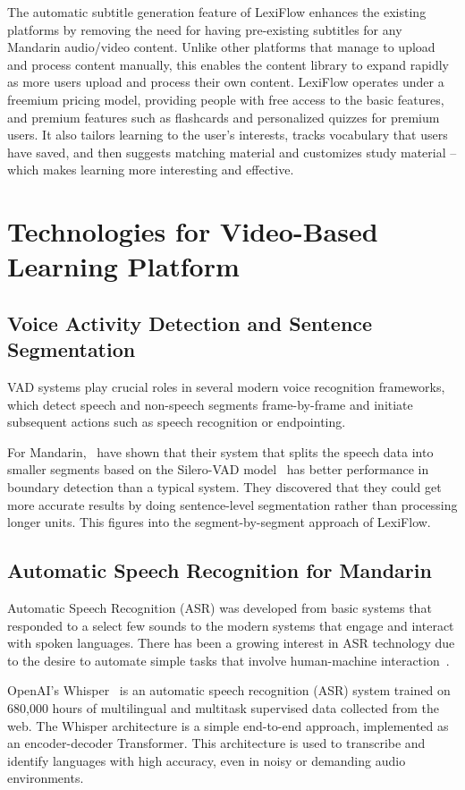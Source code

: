 \documentclass[oneside]{utmthesis}
\begin{document}
The automatic subtitle generation feature of LexiFlow enhances the existing platforms by removing the need for having pre-existing subtitles for any Mandarin audio/video content. Unlike other platforms that manage to upload and process content manually, this enables the content library to expand rapidly as more users upload and process their own content. LexiFlow operates under a freemium pricing model, providing people with free access to the basic features, and premium features such as flashcards and personalized quizzes for premium users. It also tailors learning to the user's interests, tracks vocabulary that users have saved, and then suggests matching material and customizes study material – which makes learning more interesting and effective.


\section{Technologies for Video-Based Learning Platform}
\subsection{Voice Activity Detection and Sentence Segmentation}
VAD systems play crucial roles in several modern voice recognition frameworks, which detect speech and non-speech segments frame-by-frame and initiate subsequent actions such as speech recognition or endpointing.~\citep{buddi2023,icassp-2019,chen2020,kumar2024}

For Mandarin,~\citet{pan2025} have shown that their system that splits the speech data into smaller segments based on the Silero-VAD model~\citep{sileroVAD} has better performance in boundary detection than a typical system. They discovered that they could get more accurate results by doing sentence-level segmentation rather than processing longer units. This figures into the segment-by-segment approach of LexiFlow.

\subsection{Automatic Speech Recognition for Mandarin}
Automatic Speech Recognition (ASR) was developed from basic systems that responded to a select few sounds to the modern systems that engage and interact with spoken languages. There has been a growing interest in ASR technology due to the desire to automate simple tasks that involve human-machine interaction~\citep{juang2005}.

OpenAI's Whisper~\citep{radford2023robust} is an automatic speech recognition (ASR) system trained on 680,000 hours of multilingual and multitask supervised data collected from the web.  The Whisper architecture is a simple end-to-end approach, implemented as an encoder-decoder Transformer. This architecture is used to transcribe and identify languages with high accuracy, even in noisy or demanding audio environments.
\end{document}
